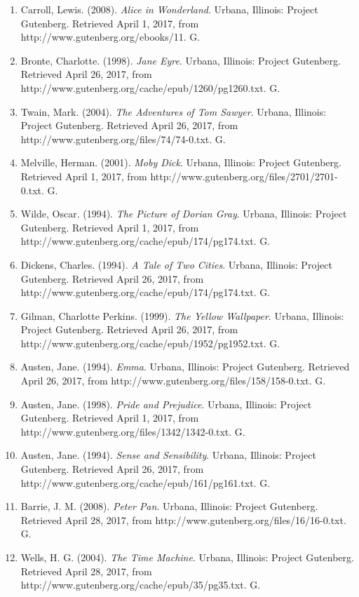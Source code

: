 \documentclass[11pt,a4paper]{article}
\begin{document}
\begin{enumerate}
   \item Carroll, Lewis. (2008). \textit{Alice in Wonderland}. Urbana, Illinois: Project Gutenberg. Retrieved April 1, 2017, from http://www.gutenberg.org/ebooks/11. G.
   \item Bronte, Charlotte. (1998). \textit{Jane Eyre}. Urbana, Illinois: Project Gutenberg. Retrieved April 26, 2017, from http://www.gutenberg.org/cache/epub/1260/pg1260.txt. G. 
   \item Twain, Mark. (2004). \textit{The Adventures of Tom Sawyer}. Urbana, Illinois: Project Gutenberg. Retrieved April 26, 2017, from http://www.gutenberg.org/files/74/74-0.txt. G.
   \item Melville, Herman. (2001). \textit{Moby Dick}. Urbana, Illinois: Project Gutenberg. Retrieved April 1, 2017, from http://www.gutenberg.org/files/2701/2701-0.txt. G.
   \item Wilde, Oscar. (1994). \textit{The Picture of Dorian Gray}. Urbana, Illinois: Project Gutenberg. Retrieved April 1, 2017, from http://www.gutenberg.org/cache/epub/174/pg174.txt. G.
   \item Dickens, Charles. (1994). \textit{A Tale of Two Cities}. Urbana, Illinois: Project Gutenberg. Retrieved April 26, 2017, from http://www.gutenberg.org/cache/epub/174/pg174.txt. G.
   \item Gilman, Charlotte Perkins. (1999). \textit{The Yellow Wallpaper}. Urbana, Illinois: Project Gutenberg. Retrieved April 26, 2017, from http://www.gutenberg.org/cache/epub/1952/pg1952.txt. G.
   \item Austen, Jane. (1994). \textit{Emma}. Urbana, Illinois: Project Gutenberg. Retrieved April 26, 2017, from http://www.gutenberg.org/files/158/158-0.txt. G. 
   \item Austen, Jane. (1998). \textit{Pride and Prejudice}. Urbana, Illinois: Project Gutenberg. Retrieved April 1, 2017, from http://www.gutenberg.org/files/1342/1342-0.txt. G.
   \item Austen, Jane. (1994). \textit{Sense and Sensibility}. Urbana, Illinois: Project Gutenberg. Retrieved April 26, 2017, from http://www.gutenberg.org/cache/epub/161/pg161.txt. G.
   \item Barrie, J. M. (2008). \textit{Peter Pan}. Urbana, Illinois: Project Gutenberg. Retrieved April 28, 2017, from http://www.gutenberg.org/files/16/16-0.txt. G.
   \item Wells, H. G. (2004). \textit{The Time Machine}. Urbana, Illinois: Project Gutenberg. Retrieved April 28, 2017, from http://www.gutenberg.org/cache/epub/35/pg35.txt. G.

\end{enumerate}
\end{document}
